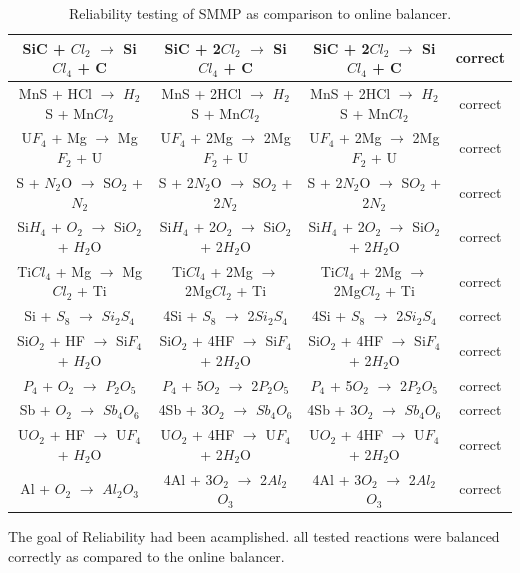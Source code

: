 \documentclass[12pt, titlepage]{article}
\begin{document}
\begin{table}[h!]
{\begin{tabular}{|c|c|c|c|}
SiC + $Cl_2$ $\rightarrow$ Si$Cl_4$ + C & SiC + 2$Cl_2$ $\rightarrow$ Si$Cl_4$ + C & SiC + 2$Cl_2$ $\rightarrow$ Si$Cl_4$ + C & correct \\ \hline
MnS + HCl $\rightarrow$ $H_2$S + Mn$Cl_2$ & MnS + 2HCl $\rightarrow$ $H_2$S + Mn$Cl_2$ & MnS + 2HCl $\rightarrow$ $H_2$S + Mn$Cl_2$ & correct  \\ \hline
 U$F_4$ + Mg $\rightarrow$ Mg$F_2$ + U & U$F_4$ + 2Mg $\rightarrow$ 2Mg$F_2$ + U &  U$F_4$ + 2Mg $\rightarrow$ 2Mg$F_2$ + U & correct  \\ \hline
S + $N_2$O $\rightarrow$ S$O_2$ + $N_2$ & S + 2$N_2$O $\rightarrow$ S$O_2$ + 2$N_2$ & S + 2$N_2$O $\rightarrow$ S$O_2$ + 2$N_2$ & correct  \\ \hline
Si$H_4$ + $O_2$ $\rightarrow$ Si$O_2$ + $H_2$O & Si$H_4$ + 2$O_2$ $\rightarrow$ Si$O_2$ + 2$H_2$O & Si$H_4$ + 2$O_2$ $\rightarrow$ Si$O_2$ + 2$H_2$O & correct  \\ \hline
Ti$Cl_4$ + Mg $\rightarrow$ Mg$Cl_2$ + Ti & Ti$Cl_4$ + 2Mg $\rightarrow$ 2Mg$Cl_2$ + Ti  & Ti$Cl_4$ + 2Mg $\rightarrow$ 2Mg$Cl_2$ + Ti & correct  \\ \hline
Si + $S_8$ $\rightarrow$ $Si_2$$S_4$ & 4Si + $S_8$ $\rightarrow$ 2$Si_2$$S_4$ & 4Si + $S_8$ $\rightarrow$ 2$Si_2$$S_4$ & correct \\ \hline
Si$O_2$ + HF $\rightarrow$ Si$F_4$ + $H_2$O & Si$O_2$ + 4HF $\rightarrow$ Si$F_4$ + 2$H_2$O & Si$O_2$ + 4HF $\rightarrow$ Si$F_4$ + 2$H_2$O & correct \\ \hline
$P_4$ + $O_2$ $\rightarrow$ $P_2$$O_5$ & $P_4$ + 5$O_2$ $\rightarrow$ 2$P_2$$O_5$ & $P_4$ + 5$O_2$ $\rightarrow$ 2$P_2$$O_5$& correct \\ \hline
Sb + $O_2$ $\rightarrow$ $Sb_4$$O_6$ & 4Sb + 3$O_2$ $\rightarrow$ $Sb_4$$O_6$ & 4Sb + 3$O_2$ $\rightarrow$ $Sb_4$$O_6$ & correct \\ \hline
U$O_2$ + HF $\rightarrow$ U$F_4$ + $H_2$O  & U$O_2$ + 4HF $\rightarrow$ U$F_4$ + 2$H_2$O  & U$O_2$ + 4HF $\rightarrow$ U$F_4$ + 2$H_2$O & correct \\ \hline
Al + $O_2$ $\rightarrow$ $Al_2$$O_3$ & 4Al + 3$O_2$ $\rightarrow$ 2$Al_2$$O_3$ & 4Al + 3$O_2$ $\rightarrow$ 2$Al_2$$O_3$ & correct  \\ \hline
\hline
\end{tabular}}
\caption{Reliability testing of SMMP as comparison to online balancer.}
\label{Table:R_trace}
\end{table}

The goal of Reliability had been acamplished. all tested reactions were balanced correctly as compared to the online balancer. 
	
\end{document}
